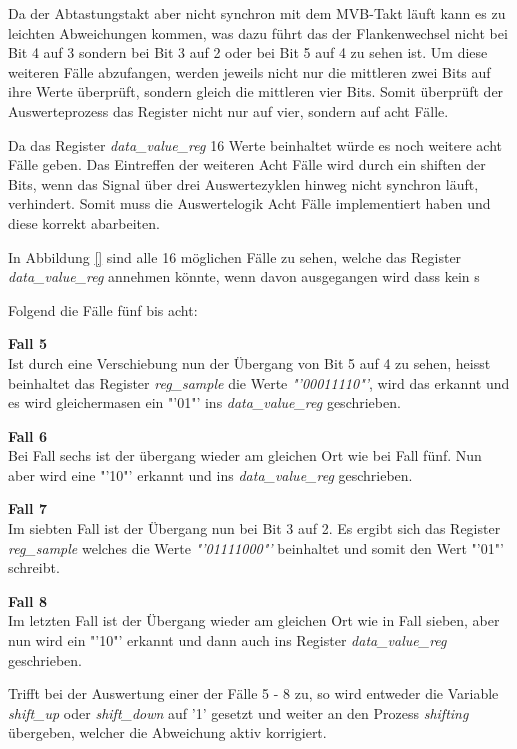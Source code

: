 Da der Abtastungstakt aber nicht synchron mit dem MVB-Takt läuft kann es zu leichten Abweichungen kommen, was dazu führt das der Flankenwechsel nicht bei Bit 4 auf 3 sondern bei Bit 3 auf 2 oder
bei Bit 5 auf 4 zu sehen ist. Um diese weiteren Fälle abzufangen, werden jeweils nicht nur die 
mittleren zwei Bits auf ihre Werte überprüft, sondern gleich die mittleren vier Bits. Somit überprüft der Auswerteprozess das Register nicht nur auf vier, sondern auf acht Fälle.

Da das Register \textit{data\_value\_reg} 16 Werte beinhaltet würde es noch weitere acht Fälle
geben. Das Eintreffen der weiteren Acht Fälle wird durch ein shiften der Bits, wenn das Signal über
drei Auswertezyklen hinweg nicht synchron läuft, verhindert. Somit muss die Auswertelogik Acht
Fälle implementiert haben und diese korrekt abarbeiten.

In Abbildung \ref{} sind alle 16 möglichen Fälle zu sehen, welche das Register \textit{data\_value\_reg} annehmen könnte, wenn davon ausgegangen wird dass kein s



 
 Folgend die Fälle fünf bis acht:

\textbf{Fall 5}\\
Ist durch eine Verschiebung nun der Übergang von Bit 5 auf 4 zu sehen, heisst beinhaltet das Register \textit{reg\_sample} die Werte \textit{"'00011110"'}, wird das erkannt und es wird gleichermasen ein "'01"' ins \textit{data\_value\_reg} geschrieben.

\textbf{Fall 6}\\
Bei Fall sechs ist der übergang wieder am gleichen Ort wie bei Fall fünf. Nun aber wird eine "'10"' erkannt und ins \textit{data\_value\_reg} geschrieben.

\textbf{Fall 7}\\
Im siebten Fall ist der Übergang nun bei Bit 3 auf 2. Es ergibt sich das Register \textit{reg\_sample} welches die Werte \textit{"'01111000"'} beinhaltet und somit den Wert "'01"' schreibt.

\textbf{Fall 8}\\
Im letzten Fall ist der Übergang wieder am gleichen Ort wie in Fall sieben, aber nun wird ein "'10"' erkannt und dann auch ins Register \textit{data\_value\_reg} geschrieben.

Trifft bei der Auswertung einer der Fälle 5 - 8 zu, so wird entweder die Variable \textit{shift\_up} oder \textit{shift\_down} auf '1' gesetzt und weiter an den Prozess \textit{shifting} übergeben, welcher die Abweichung aktiv korrigiert.

